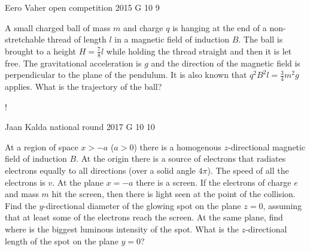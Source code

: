 \documentclass[11pt]{article}
\begin{document}
{Eero Vaher} %
{open competition} %
{2015} %
{G 10} %
{9} %
{

\ifEngStatement
A small charged ball of mass $m$ and charge $q$ is hanging at the end of a non-stretchable thread of length $l$ in a magnetic field of induction $B$. The ball is brought to a height $H=\frac{7}{8}l$ while holding the thread straight and then it is let free. The gravitational acceleration is $g$ and the direction of the magnetic field is perpendicular to the plane of the pendulum. It is also known that $q^2B^2l=\frac{3}{4}m^2g$ applies. What is the trajectory of the ball?
\begin{center}
\begin{resizebox}{0.5\linewidth}{!}{
}
\end{resizebox}
\end{center}
\fi
}

{Jaan Kalda} %
{national round} %
{2017} %
{G 10} %
{10} %
{

\ifEngStatement
At a region of space $x>-a$ ($a>0$) there is a homogenous $z$-directional magnetic field of induction $B$. At the origin there is a source of electrons that radiates electrons equally to all directions (over a solid angle $4\pi$). The speed of all the electrons is $v$. At the plane $x=-a$ there is a screen. If the electrons of charge $e$ and mass $m$ hit the screen, then there is light seen at the point of the collision. Find the $y$-directional diameter of the glowing spot on the plane $z = 0$, assuming that at least some of the electrons reach the screen. At the same plane, find where is the biggest luminous intensity of the spot. What is the $z$-directional length of the spot on the plane $y=0$?
\fi
}
\newpage\subsection{\protect{}}
\end{document}
